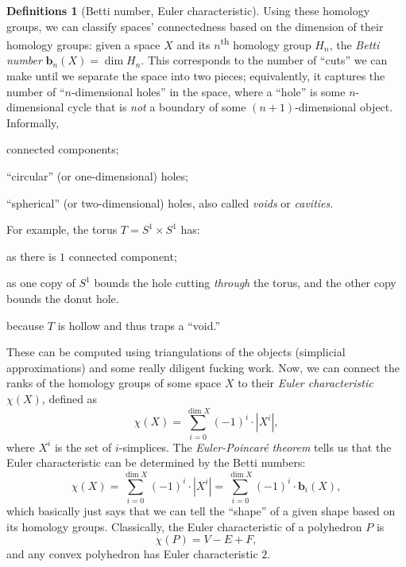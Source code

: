 \documentclass[11pt]{article}
\theoremstyle{definition}
\newtheorem*{definitions*}{Definitions}
\newcommand{\betti}{\mathbf{b}}									%
\begin{document}
		\begin{definitions*}[Betti number, Euler characteristic]
			Using these homology groups, we can classify spaces' connectedness based on the dimension of their homology groups: given a space $X$ and its $n$\textsuperscript{th} homology group $H_n$, the \textit{Betti number} $\betti_n(X)=\dim H_n$. This corresponds to the number of ``cuts'' we can make until we separate the space into two pieces; equivalently, it captures the number of ``$n$-dimensional holes'' in the space, where a ``hole'' is some $n$-dimensional cycle that is \textit{not} a boundary of some $(n+1)$-dimensional object. Informally,
			\begin{description}[topsep=0pt, labelindent=0.5in, labelsep=0.25in]
				\item[$\betti_0$] connected components;
				\item[$\betti_1$] ``circular'' (or one-dimensional) holes;
				\item[$\betti_2$] ``spherical'' (or two-dimensional) holes, also called \textit{voids} or \textit{cavities}.	
			\end{description}
			For example, the torus $T = S^1 \times S^1$ has:
			\begin{description}[topsep=0pt, labelindent=0.5in, labelsep=0.25in, leftmargin=1.42in]
				\item[$\betti_0(T) = 1$,] as there is $1$ connected component;
				\item[$\betti_1(T) = 2$,] as one copy of $S^1$ bounds the hole cutting \textit{through} the torus, and the other copy bounds the donut hole.
				\item[$\betti_2(T) = 1$,] because $T$ is hollow and thus traps a ``void.''
			\end{description}
			These can be computed using triangulations of the objects (simplicial approximations) and some really diligent fucking work. Now, we can connect the ranks of the homology groups of some space $X$ to their \textit{Euler characteristic $\chi(X)$}, defined as $$ \chi(X) = \sum_{i = 0}^{\dim X} (-1)^i \cdot |X^i|, $$ where $X^i$ is the set of $i$-simplices. The \textit{Euler-Poincar\'e theorem} tells us that the Euler characteristic can be determined by the Betti numbers: $$ \chi(X) = \sum_{i = 0}^{\dim X} (-1)^i \cdot |X^i| = \sum_{i = 0}^{\dim X} (-1)^i \cdot \betti_i(X), $$ which basically just says that we can tell the ``shape'' of a given shape based on its homology groups. Classically, the Euler characteristic of a polyhedron $P$ is $$\chi(P) = V - E + F, $$ and any convex polyhedron has Euler characteristic $2$.
		\end{definitions*}
\end{document}
